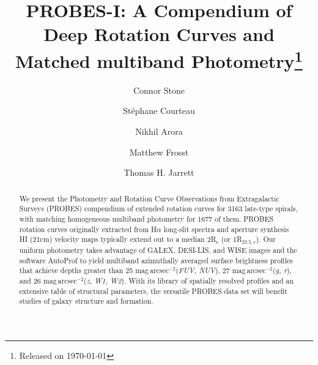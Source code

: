 \documentclass[twocolumn]{aastex631}
\newcommand{\magss}{{mag{\,}arcsec\ensuremath{^{-2}}}\xspace}
\newcommand{\probesnedunique}{3163\xspace}
\newcommand{\probesphotometric}{1677\xspace}
\newcommand{\probesrcextentre}{2\xspace}
\newcommand{\probesrcextentriso}{1\xspace}
\begin{document}
\title{PROBES-I: A Compendium of Deep Rotation Curves and Matched multiband Photometry\footnote{Released on \today}}


\author[0000-0002-9086-6398]{Connor Stone}

\author[0000-0002-8597-6277]{St{\'e}phane Courteau}
  
\author[0000-0002-3929-9316]{Nikhil Arora}
  
\author[0000-0003-3506-0858]{Matthew Frosst}

\author[0000-0002-4939-734X]{Thomas H. Jarrett}

\begin{abstract}

We present the Photometry and Rotation Curve Observations from Extragalactic Surveys (PROBES) compendium of extended rotation curves for \probesnedunique late-type spirals, with matching homogeneous multiband photometry for \probesphotometric of them. 
PROBES rotation curves originally extracted from H$\alpha$ long-slit spectra and aperture synthesis HI (21cm) velocity maps typically extend out to a median {\probesrcextentre}R$_\textrm{e}$ (or {\probesrcextentriso}R$_{23.5, r}$).
Our uniform photometry takes advantage of GALEX, DESI-LIS, and WISE images and the software AutoProf to yield multiband azimuthally averaged surface brightness profiles that achieve depths greater than 25 \magss ({\it FUV, NUV}), 27 \magss ({\it g, r}), and 26 \magss ({\it z, W1, W2}).
With its library of spatially resolved profiles and an extensive table of structural parameters, the versatile PROBES data set will benefit studies of galaxy structure and formation. 
\end{abstract}

\end{document}
